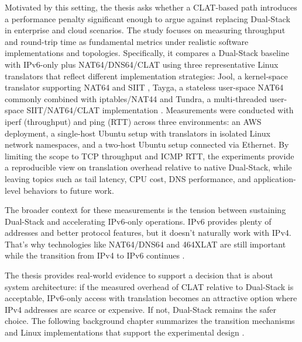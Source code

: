 Motivated by this setting, the thesis asks whether a CLAT-based path introduces a performance penalty significant enough to argue against replacing Dual-Stack in enterprise and cloud scenarios. The study focuses on measuring throughput and round-trip time as fundamental metrics under realistic software implementations and topologies. Specifically, it compares a Dual-Stack baseline with IPv6-only plus NAT64/DNS64/CLAT using three representative Linux translators that reflect different implementation strategies: Jool, a kernel-space translator supporting NAT64 and SIIT \cite{jool_introduction}, Tayga, a stateless user-space NAT64 commonly combined with iptables/NAT44 \cite{palrd_tayga_readme,Repas_Farnadi_Lencse_2014} and Tundra, a multi-threaded user-space SIIT/NAT64/CLAT implementation \cite{labuda_tundra_nat64}. Measurements were conducted with iperf (throughput) and ping (RTT) across three environments: an AWS deployment, a single-host Ubuntu setup with translators in isolated Linux network namespaces, and a two-host Ubuntu setup connected via Ethernet. By limiting the scope to TCP throughput and ICMP RTT, the experiments provide a reproducible view on translation overhead relative to native Dual-Stack, while leaving topics such as tail latency, CPU cost, DNS performance, and application-level behaviors to future work.

The broader context for these measurements is the tension between sustaining Dual-Stack and accelerating IPv6-only operations. IPv6 provides plenty of addresses and better protocol features, but it doesn’t naturally work with IPv4. That’s why technologies like NAT64/DNS64 and 464XLAT are still important while the transition from IPv4 to IPv6 continues \cite{7737362,LEVIN20141059}.

The thesis provides real-world evidence to support a decision that is about system architecture: if the measured overhead of CLAT relative to Dual-Stack is acceptable, IPv6-only access with translation becomes an attractive option where IPv4 addresses are scarce or expensive. If not, Dual-Stack remains the safer choice. The following background chapter summarizes the transition mechanisms and Linux implementations that support the experimental design \cite{rfc6877, rfc4241}.



